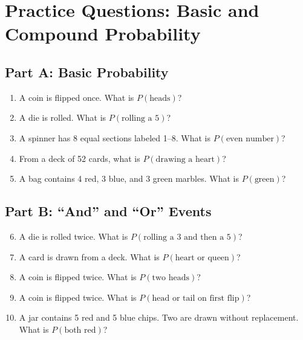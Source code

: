 \documentclass[12pt]{article}
\begin{document}
\newpage


\section*{Practice Questions: Basic and Compound Probability}

\subsection*{Part A: Basic Probability}
\begin{enumerate}
  \item A coin is flipped once. What is \(P(\text{heads})\)?
  \item A die is rolled. What is \(P(\text{rolling a 5})\)?
  \item A spinner has 8 equal sections labeled 1–8. What is \(P(\text{even number})\)?
  \item From a deck of 52 cards, what is \(P(\text{drawing a heart})\)?
  \item A bag contains 4 red, 3 blue, and 3 green marbles. What is \(P(\text{green})\)?
\end{enumerate}

\subsection*{Part B: “And” and “Or” Events}
\begin{enumerate}
  \setcounter{enumi}{5}
  \item A die is rolled twice. What is \(P(\text{rolling a 3 and then a 5})\)?
  \item A card is drawn from a deck. What is \(P(\text{heart or queen})\)?
  \item A coin is flipped twice. What is \(P(\text{two heads})\)?
  \item A coin is flipped twice. What is \(P(\text{head or tail on first flip})\)?
  \item A jar contains 5 red and 5 blue chips. Two are drawn without replacement. What is \(P(\text{both red})\)?
\end{enumerate}
\end{document}
